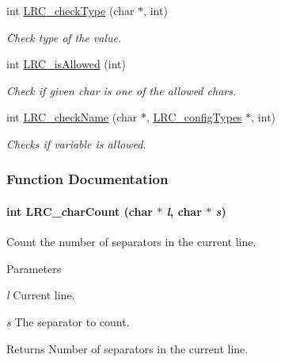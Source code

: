 \begin{DoxyCompactItemize}
int \hyperlink{group___l_r_c__internals_ga727eec2e862e3acf7206d11cd2636127}{LRC\_\-checkType} (char $\ast$, int)
\begin{DoxyCompactList}\small\item\em Check type of the value. \item\end{DoxyCompactList}\item 
int \hyperlink{group___l_r_c__internals_ga6ac7bc617b346047519f4c3589a311bd}{LRC\_\-isAllowed} (int)
\begin{DoxyCompactList}\small\item\em Check if given char is one of the allowed chars. \item\end{DoxyCompactList}\item 
int \hyperlink{group___l_r_c__internals_ga40dad9664f69eed3491f5753db5a76b0}{LRC\_\-checkName} (char $\ast$, \hyperlink{struct_l_r_c__config_types}{LRC\_\-configTypes} $\ast$, int)
\begin{DoxyCompactList}\small\item\em Checks if variable is allowed. \item\end{DoxyCompactList}\end{DoxyCompactItemize}


\subsubsection{Function Documentation}
\hypertarget{group___l_r_c__internals_gaadc8707a894b997457d320923c940721}{
\paragraph[{LRC\_\-charCount}]{\setlength{\rightskip}{0pt plus 5cm}int LRC\_\-charCount (char $\ast$ {\em l}, \/  char $\ast$ {\em s})}\hfill}
\label{group___l_r_c__internals_gaadc8707a894b997457d320923c940721}


Count the number of separators in the current line. 
\begin{DoxyParams}{Parameters}
\item[{\em l}]Current line.\item[{\em s}]The separator to count.\end{DoxyParams}
\begin{DoxyReturn}{Returns}
Number of separators in the current line. 
\end{DoxyReturn}


